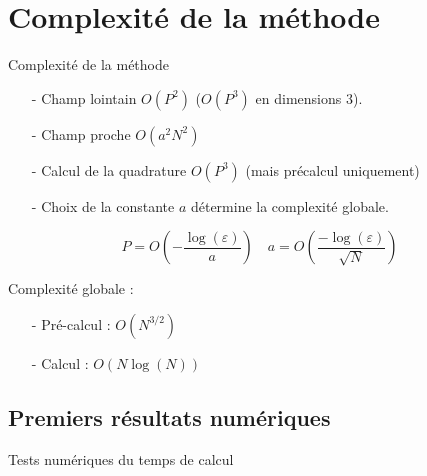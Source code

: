 \documentclass[11pt]{beamer}
\theoremstyle{plain}
\theoremstyle{definition}
\begin{document}
\section{Complexité de la méthode}

\begin{frame}{Complexité de la méthode}
\begin{itemize}
\item[-] Champ lointain  $O(P^2)$ ($O(P^3)$ en dimensions $3$).
\item[-] Champ proche $O(a^2N^2)$
\item[-] Calcul de la quadrature $O(P^3)$ (mais précalcul uniquement)
\item[-] Choix de la constante $a$ détermine la complexité globale. 
\end{itemize}
\[ P = O\left( -\dfrac{\log(\varepsilon)}{a}\right) \quad a =  O\left(\dfrac{-\log(\varepsilon)}{\sqrt{N}}\right)\]

Complexité globale : 
\begin{itemize}
\item[-] Pré-calcul : $O(N^{3/2})$
\item[-] Calcul : $O(N \log(N) )$
\end{itemize}
\end{frame}

\subsection{Premiers résultats numériques}
\begin{frame}{Tests numériques du temps de calcul}
\begingroup
\centering
{}%
%
\endgroup
\end{frame}
\end{document}

